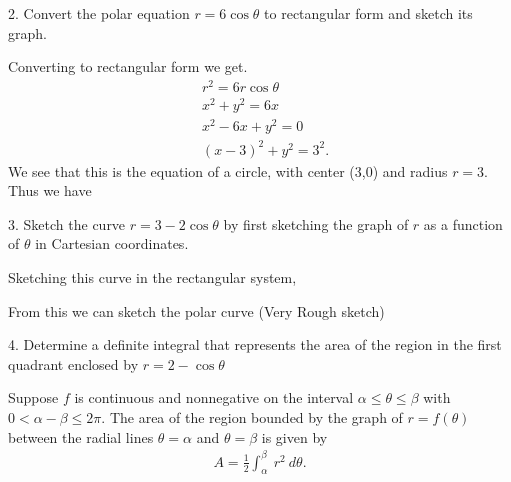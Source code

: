 \documentclass{report}
\begin{document}
    \pagebreak \bigbreak \noindent
    \begin{mdframed}
        2. Convert the polar equation $r=6\cos{\theta}$ to rectangular form and sketch its graph.
    \end{mdframed}
    Converting to rectangular form we get.
    \begin{align*}
        &r^{2} = 6r\cos{\theta } \\
        &x^{2} +y^{2} = 6x \\
        &x^{2} -6x + y^{2} = 0 \\
        &(x-3)^{2} + y^{2} = 3^{2}
    .\end{align*}
    We see that this is the equation of a circle, with center (3,0) and radius $r=3$. Thus we have
    \bigbreak \noindent 
\begin{figure}[ht]
    \centering
    \label{fig:circle2}
\end{figure}

    \pagebreak \bigbreak \noindent 
    \begin{mdframed}
        3. Sketch the curve $r=3-2\cos{\theta}$ by first sketching the graph of $r$ as a function of $\theta$ in Cartesian coordinates.
    \end{mdframed}
    \bigbreak \noindent 
    Sketching this curve in the rectangular system,
    \bigbreak \noindent 
    \begin{figure}[ht]
        \centering
        \label{fig:maneaan}
    \end{figure}

    \bigbreak \noindent 
    From this we can sketch the polar curve (Very Rough sketch)
    \bigbreak \noindent 
\begin{figure}[ht]
    \centering
    \label{fig:pkill2}
\end{figure}

    \pagebreak \bigbreak \noindent 
    \begin{mdframed}
        4. Determine a definite integral that represents the area of the region in the first quadrant enclosed by $r = 2-\cos{\theta}$
    \end{mdframed}
    \bigbreak \noindent 
    \begin{remark}
       Suppose $f$ is continuous and nonnegative on the interval $\alpha \leq \theta \leq \beta$ with $0 < \alpha - \beta \leq 2\pi $. The area of the region bounded by the graph of $r=f(\theta)$ between the radial lines $\theta =\alpha$ and $\theta =\beta$ is given by
       \begin{align*}
           A = \frac{1}{2}\int_{\alpha}^{\beta}\ r^{2}\ d\theta 
       .\end{align*}
    \end{remark}
    
\end{document}
